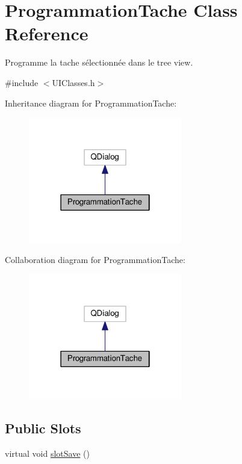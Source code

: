 \hypertarget{class_programmation_tache}{}\section{Programmation\+Tache Class Reference}
\label{class_programmation_tache}


Programme la tache sélectionnée dans le tree view.  




{\ttfamily \#include $<$U\+I\+Classes.\+h$>$}



Inheritance diagram for Programmation\+Tache\+:\nopagebreak
\begin{figure}[H]
\begin{center}
\leavevmode
\includegraphics[width=190pt]{class_programmation_tache__inherit__graph}
\end{center}
\end{figure}


Collaboration diagram for Programmation\+Tache\+:\nopagebreak
\begin{figure}[H]
\begin{center}
\leavevmode
\includegraphics[width=190pt]{class_programmation_tache__coll__graph}
\end{center}
\end{figure}
\subsection*{Public Slots}
\begin{DoxyCompactItemize}
\item 
virtual void \hyperlink{class_programmation_tache_a00d0c96edf68ce7418d368121a901fdc}{slot\+Save} ()
\end{DoxyCompactItemize}
